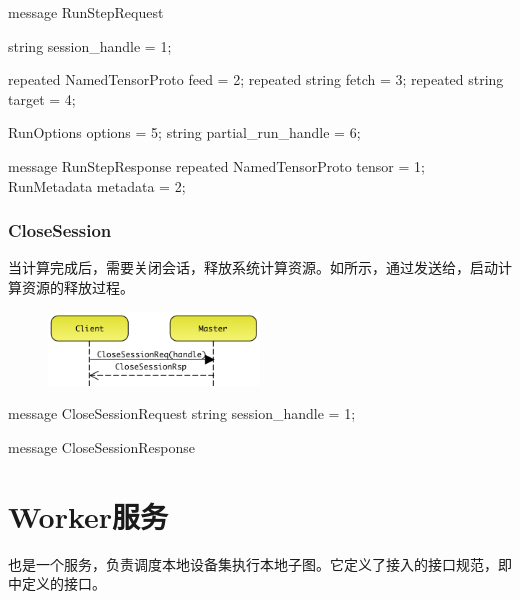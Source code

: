 \begin{content}
\begin{content}
\begin{leftbar}
\begin{c++}
message RunStepRequest {
  string session_handle = 1;

  repeated NamedTensorProto feed = 2;
  repeated string fetch = 3;
  repeated string target = 4;

  RunOptions options = 5;
  string partial_run_handle = 6;
}

message RunStepResponse {
  repeated NamedTensorProto tensor = 1;
  RunMetadata metadata = 2;
}
\end{c++}
\end{leftbar}

\subsubsection{CloseSession}

当计算完成后，需要关闭会话，释放系统计算资源。如所示，通过发送给，启动计算资源的释放过程。

\begin{figure}[H]
\centering
\includegraphics[width=0.5\textwidth]{figures/dist-ms-closs-sess.png}
\caption{}
 \label{fig:dist-ms-closs-sess}
\end{figure}

\begin{leftbar}
\begin{c++}
message CloseSessionRequest {
  string session_handle = 1;
}

message CloseSessionResponse {
}
\end{c++}
\end{leftbar}

\section{Worker服务}

\begin{content}

也是一个服务，负责调度本地设备集执行本地子图。它定义了接入的接口规范，即中定义的接口。


\end{content}
\end{content}
\end{content}

